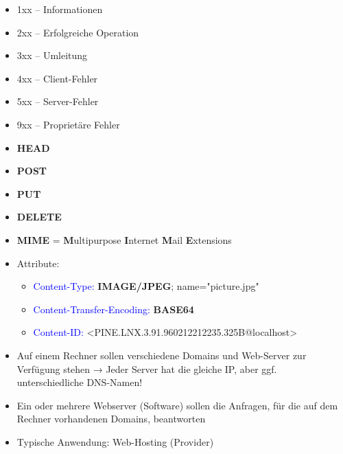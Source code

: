 \begin{itemize}
    \item 1xx – Informationen
    \item 2xx – Erfolgreiche Operation
    \item 3xx – Umleitung
    \item 4xx – Client-Fehler
    \item 5xx – Server-Fehler
    \item 9xx – Proprietäre Fehler
\end{itemize}

\begin{itemize}
    \item \textbf{HEAD}
    \item \textbf{POST}
    \item \textbf{PUT}
    \item \textbf{DELETE}
\end{itemize}

\begin{itemize}
    \item \textbf{MIME} = \textbf{M}ultipurpose \textbf{I}nternet \textbf{M}ail \textbf{E}xtensions
    \item Attribute:
    \begin{itemize}
        \item \textcolor{blue}{Content-Type:} \textbf{IMAGE/JPEG}; name="picture.jpg"
        \item \textcolor{blue}{Content-Transfer-Encoding:} \textbf{BASE64}
        \item \textcolor{blue}{Content-ID:} <PINE.LNX.3.91.960212212235.325B@localhost>
    \end{itemize}
\end{itemize}

\begin{itemize}
    \item Auf einem Rechner sollen verschiedene Domains und Web-Server zur Verfügung stehen → Jeder Server hat die gleiche IP, aber ggf. unterschiedliche DNS-Namen!
    \item Ein oder mehrere Webserver (Software) sollen die Anfragen, für die auf dem Rechner vorhandenen Domains, beantworten
    \item Typische Anwendung: Web-Hosting (Provider)
\end{itemize}

